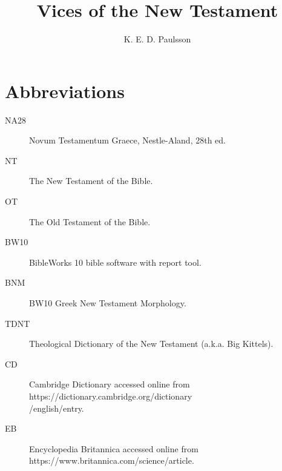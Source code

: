 \documentclass[a4paper,twocolumn,twoside,notitlepage,10pt]{article}
\title{Vices of the New Testament}
\author{K. E. D. Paulsson}
\begin{document}
\frenchspacing
\newcommand{\entlbl}[1]{\index[eng]{#1}\label{itm:#1}}
\newcommand{\entref}[1]{\emph{#1} ~($\rightarrow$~\pageref{itm:#1})}
\newcommand{\entrefgls}[1]{\emph{#1}$\rightarrow$\pageref{itm:#1}}
\newcommand{\grc}[1]{\greektext{#1}\latintext}
\newcommand{\cdfoot}[2]{\footnote{\emph{CD}, s.v. ``{#1},'' accessed \printdate{#2}.}}
\newcommand{\bkfoot}[3]{\footnote{{#3}, ``{#1},'' \emph{TDNT} {#2}.}}
\newcommand{\bksfoot}[2]{\footnote{{#2}, \emph{TDNT} {#1}.}}


\newcommand{\entgls}[1]{\gls{#1} \glsdesc{#1}}
\newcommand{\entglos}[1]{\\\textbf{\gls{#1}} \glsdesc{#1}}



\maketitle



\section{Abbreviations}
\begin{description}
    \item[NA28] Novum Testamentum Graece, Nestle-Aland, 28th ed.
	\item[NT] The New Testament of the Bible.
	\item[OT] The Old Testament of the Bible.
	\item[BW10] BibleWorks 10 bible software with report tool.
	\item[BNM] BW10 Greek New Testament Morphology.
	\item[TDNT] Theological Dictionary of the New Testament (a.k.a. Big Kittels).
	\item[CD] Cambridge Dictionary accessed online from https://dictionary.cambridge.org/dictionary\\/english/\textlangle entry\textrangle.
	\item[EB] Encyclopedia Britannica accessed online from https://www.britannica.com/science/\textlangle article\textrangle.
\end{description}




\end{document}
